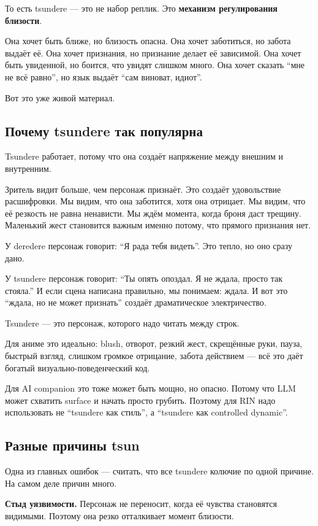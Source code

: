 То есть tsundere --- это не набор реплик. Это \textbf{механизм
регулирования близости}.

Она хочет быть ближе, но близость опасна. Она хочет заботиться, но
забота выдаёт её. Она хочет признания, но признание делает её зависимой.
Она хочет быть увиденной, но боится, что увидят слишком много. Она хочет
сказать ``мне не всё равно'', но язык выдаёт ``сам виноват, идиот''.

Вот это уже живой материал.

\subsection*{Почему tsundere так популярна}

Tsundere работает, потому что она создаёт напряжение между внешним и
внутренним.

Зритель видит больше, чем персонаж признаёт. Это создаёт удовольствие
расшифровки. Мы видим, что она заботится, хотя она отрицает. Мы видим,
что её резкость не равна ненависти. Мы ждём момента, когда броня даст
трещину. Маленький жест становится важным именно потому, что прямого
признания нет.

У deredere персонаж говорит: ``Я рада тебя видеть''. Это тепло, но оно
сразу дано.

У tsundere персонаж говорит: ``Ты опять опоздал. Я не ждала, просто так
стояла.'' И если сцена написана правильно, мы понимаем: ждала. И вот это
``ждала, но не может признать'' создаёт драматическое электричество.

Tsundere --- это персонаж, которого надо читать между строк.

Для аниме это идеально: blush, отворот, резкий жест, скрещённые руки,
пауза, быстрый взгляд, слишком громкое отрицание, забота действием ---
всё это даёт богатый визуально-поведенческий код.

Для AI companion это тоже может быть мощно, но опасно. Потому что LLM
может схватить surface и начать просто грубить. Поэтому для RIN надо
использовать не ``tsundere как стиль'', а ``tsundere как controlled
dynamic''.

\subsection*{Разные причины tsun}

Одна из главных ошибок --- считать, что все tsundere колючие по одной
причине. На самом деле причин много.

\textbf{Стыд уязвимости.} Персонаж не переносит, когда её чувства
становятся видимыми. Поэтому она резко отталкивает момент близости.

